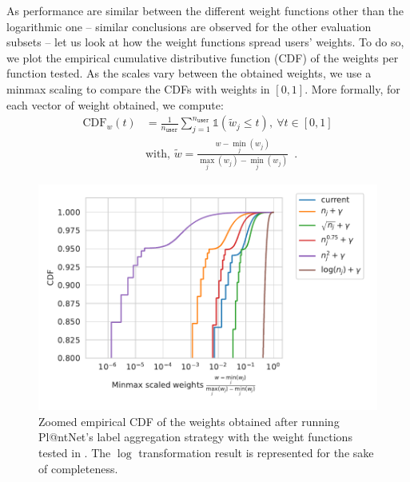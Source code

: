 As performance are similar between the different weight functions other than the logarithmic one -- similar conclusions are observed for the other evaluation subsets -- let us look at how the weight functions spread users' weights.
To do so, we plot the empirical cumulative distributive function (CDF) of the weights per function tested.
As the scales vary between the obtained weights, we use a minmax scaling to compare the CDFs with weights in $[0,1]$. More formally, for each vector of weight obtained, we compute:
\begin{align*}
\mathrm{CDF}_w(t)&=\frac{1}{n_\texttt{user}}\sum_{j=1}^{n_\texttt{user}} \mathds{1}\left( \tilde{w}_j \leq t  \right),\ \forall t\in [0,1] \\
& \text{with, } \tilde{w} = \frac{w - \min_j(w_j)}{\max_j(w_j) - \min_j(w_j)}  \enspace.
\end{align*}

\begin{figure}[htb]
    \centering
    \includegraphics[width=.75\textwidth]{./images_plantnet/cdf_weights.pdf}
    \caption{Zoomed empirical CDF of the weights obtained after running Pl@ntNet's label aggregation strategy with the weight functions tested in . The $\log$ transformation result is represented for the sake of completeness.}
    \label{fig:cdf_plantnet}
\end{figure}

